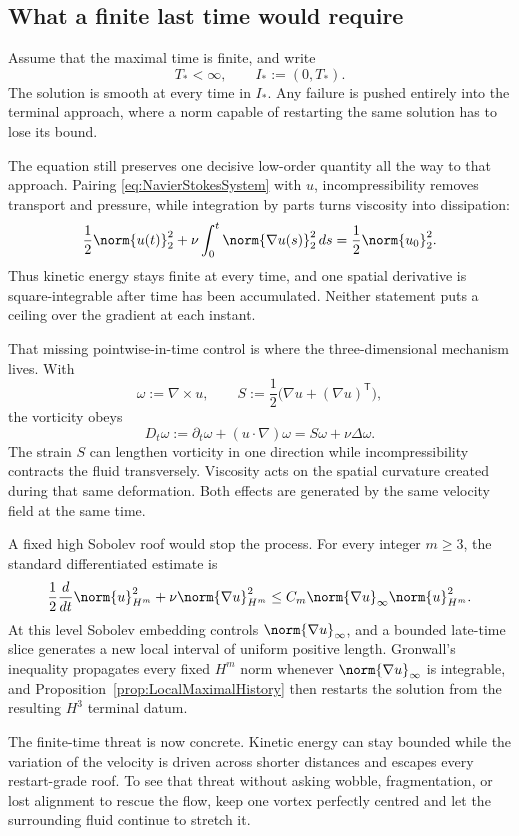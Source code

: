\subsection{What a finite last time would require}\label{sub:WhatFiniteFailureRequires}

Assume that the maximal time is finite, and write
\[
  T_*<\infty,
  \qquad
  I_*:=(0,T_*).
\]
The solution is smooth at every time in \(I_*\).
Any failure is pushed entirely into the terminal approach, where a norm capable of restarting the same solution has to lose its bound.

The equation still preserves one decisive low-order quantity all the way to that approach.
Pairing \eqref{eq:NavierStokesSystem} with \(u\), incompressibility removes transport and pressure, while integration by parts turns viscosity into dissipation:
\begin{equation}\label{eq:BodyEnergyIdentity}
  \frac12\norm{u(t)}_2^2
  +\nu\int_0^t\norm{\nabla u(s)}_2^2\,ds
  =\frac12\norm{u_0}_2^2.
\end{equation}
Thus kinetic energy stays finite at every time, and one spatial derivative is square-integrable after time has been accumulated.
Neither statement puts a ceiling over the gradient at each instant.

That missing pointwise-in-time control is where the three-dimensional mechanism lives.
With
\[
  \omega:=\nabla\times u,
  \qquad
  S:=\frac12\bigl(\nabla u+(\nabla u)^{\mathsf T}\bigr),
\]
the vorticity obeys
\begin{equation}\label{eq:VorticityEquation}
  D_t\omega
  :=\partial_t\omega+(u\cdot\nabla)\omega
  =S\omega+\nu\Delta\omega.
\end{equation}
The strain \(S\) can lengthen vorticity in one direction while incompressibility contracts the fluid transversely.
Viscosity acts on the spatial curvature created during that same deformation.
Both effects are generated by the same velocity field at the same time.

A fixed high Sobolev roof would stop the process.
For every integer \(m\geq3\), the standard differentiated estimate is
\begin{equation}\label{eq:HigherSobolevContinuationEstimate}
  \frac12\frac d{dt}\norm{u}_{H^m}^2
  +\nu\norm{\nabla u}_{H^m}^2
  \leq
  C_m\norm{\nabla u}_\infty\norm{u}_{H^m}^2.
\end{equation}
At this level Sobolev embedding controls \(\norm{\nabla u}_\infty\), and a bounded late-time slice generates a new local interval of uniform positive length.
Gronwall's inequality propagates every fixed \(H^m\) norm whenever \(\norm{\nabla u}_\infty\) is integrable, and Proposition~\ref{prop:LocalMaximalHistory} then restarts the solution from the resulting \(H^3\) terminal datum.

The finite-time threat is now concrete.
Kinetic energy can stay bounded while the variation of the velocity is driven across shorter distances and escapes every restart-grade roof.
To see that threat without asking wobble, fragmentation, or lost alignment to rescue the flow, keep one vortex perfectly centred and let the surrounding fluid continue to stretch it.
